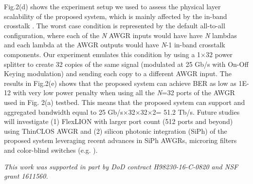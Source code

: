 \documentclass[letterpaper,10pt]{article}
\begin{document}
Fig.2(d) shows the experiment setup we used to assess the physical layer scalability of the proposed system, which is mainly affected by the in-band crosstalk \cite{JOCN_ThinCLOS,AWGR_XT_1996}. The worst case condition is represented by the default all-to-all configuration, where each of the \textit{N} AWGR inputs would have have \textit{N} lambdas and each lambda at the AWGR outputs would have \textit{N}-1 in-band crosstalk components. Our experiment emulates this condition by using a 1$\times32$ power splitter to create 32 copies of the same signal (modulated at 25 Gb/s with On-Off Keying modulation) and sending each copy to a different AWGR input. The results in Fig.2(e) shows that the proposed system can achieve BER as low as 1E-12 with very low power penalty when using all the \textit{N}=32 ports of the AWGR used in Fig. 2(a) testbed. This means that the proposed system can support and aggregated bandwidth equal to 25 Gb/s$\times$32$\times$32$\times$2= 51.2 Tb/s. Future studies will investigate (1) FlexLION with larger port count (512 ports and beyond) using ThinCLOS AWGR \cite{JOCN_ThinCLOS} and (2) silicon photonic integration (SiPh) of the proposed system leveraging recent advances in SiPh AWGRs, microring filters and color-blind switches (e.g. \cite{Han:15, MZI-IBM}).  


{\footnotesize }
{\small \textit{This work was supported in part by DoD contract H98230-16-C-0820 and NSF grant 1611560.}\par}
\end{document}
